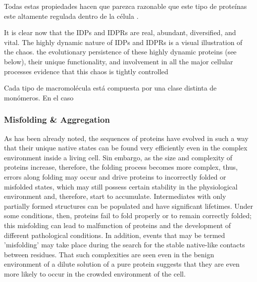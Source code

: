 Todas estas propiedades hacen que parezca razonable que este tipo de proteínas este altamente regulada dentro de la célula \cite{gsponer2008tight}.

It is clear now that the IDPs and IDPRs are real, abundant, diversified, and vital. The highly dynamic nature of IDPs and IDPRs is a visual illustration of the chaos.
the evolutionary persistence of these highly dynamic proteins (see below), their unique functionality, and involvement in all the
major cellular processes evidence that this chaos is tightly controlled



Cada tipo de macromolécula está compuesta por una clase distinta de monómeros. En el caso






























\subsubsection{Misfolding \& Aggregation}


% 

As has been already noted, the sequences of proteins have evolved in such a way that their unique native states can be found very efficiently even in the complex environment inside a living cell.
Sin embargo, as the size and complexity of proteins increase, therefore, the folding process becomes more complex,
thus, errors along folding may occur and drive proteins to incorrectly folded or misfolded states, which may still possess certain stability in the physiological
environment and, therefore, start to accumulate. 
Intermediates with only partially formed structures can be populated and have significant lifetimes. 
Under some conditions, then, proteins fail to fold properly or to remain correctly folded; this misfolding can lead to malfunction of proteins and the development of different  pathological conditions.
In addition, events that may be termed 'misfolding' may take place during the search for the stable native-like contacts between residues. 
That such complexities are seen even in the benign environment of a dilute solution of a pure protein suggests that they are even more likely to occur in the crowded environment of the cell.

